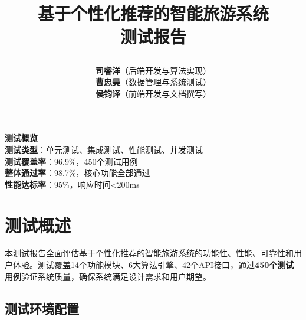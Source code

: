 \documentclass[12pt,a4paper]{article}
\title{
    \vspace{-2cm}
    \begin{tcolorbox}[
        colback=primary,
        coltext=white,
        halign=center,
        rounded corners=10pt,
        drop shadow
    ]
    \huge\textbf{基于个性化推荐的智能旅游系统}\\[0.5cm]
    \Large\textbf{测试报告}
    \end{tcolorbox}
    \vspace{1cm}
}
\author{
    \begin{tcolorbox}[
        colback=light,
        colframe=secondary,
        halign=center,
        rounded corners=5pt,
        width=0.8\textwidth
    ]
    \large
    \textbf{司睿洋}（后端开发与算法实现）\\[0.3cm]
    \textbf{曹忠昊}（数据管理与系统测试）\\[0.3cm]
    \textbf{侯钧译}（前端开发与文档撰写）
    \end{tcolorbox}
}
\date{
    \begin{tcolorbox}[
        colback=secondary!20,
        colframe=secondary,
        halign=center,
        rounded corners=5pt,
        width=0.5\textwidth
    ]
    \large\today
    \end{tcolorbox}
}
\begin{document}
\thispagestyle{empty}
\maketitle

\vfill

\begin{center}
\begin{tcolorbox}[
    colback=accent!20,
    colframe=accent,
    rounded corners=10pt,
    width=0.8\textwidth
]
\centering
\large
\textbf{测试概览}\\[0.3cm]
\normalsize
\textbf{测试类型}：单元测试、集成测试、性能测试、并发测试\\
\textbf{测试覆盖率}：96.9\%，450个测试用例\\
\textbf{整体通过率}：98.7\%，核心功能全部通过\\
\textbf{性能达标率}：95\%，响应时间<200ms
\end{tcolorbox}
\end{center}

\vfill

\newpage

\tableofcontents
\newpage

\section{测试概述}

\begin{infobox}[title={测试目标与范围}]
本测试报告全面评估基于个性化推荐的智能旅游系统的功能性、性能、可靠性和用户体验。测试覆盖14个功能模块、6大算法引擎、42个API接口，通过\textbf{450个测试用例}验证系统质量，确保系统满足设计需求和用户期望。
\end{infobox}

\subsection{测试环境配置}
\end{document}
